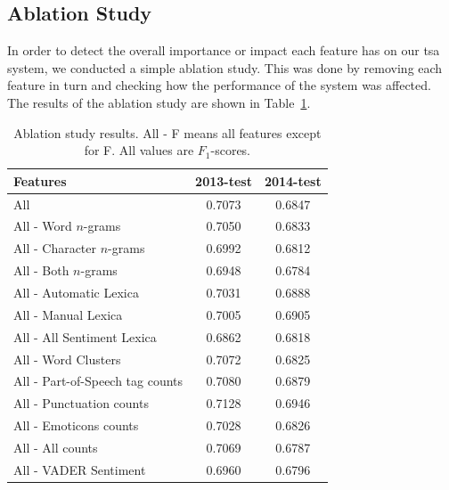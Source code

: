 \subsection*{Ablation Study}
\label{sec:ablation_study}
In order to detect the overall importance or impact each feature has on our \ac{tsa} system, we conducted a simple ablation study. This was done by removing each feature in turn and checking how the performance of the system was affected. The results of the ablation study are shown in Table~\ref{tab:ablation_study}. \\

\begin{table}[t]
    \centering
    \begin{tabular}{|l|c|c|}
        \hline
        \textbf{Features} & \textbf{2013-test} & \textbf{2014-test} \\ \hline
        All                             & 0.7073 & 0.6847 \\ \hline
        All - Word $n$-grams            & 0.7050 & 0.6833 \\
        All - Character $n$-grams       & 0.6992 & 0.6812 \\
        All - Both $n$-grams            & 0.6948 & 0.6784 \\ \hline
        All - Automatic Lexica          & 0.7031 & 0.6888 \\
        All - Manual Lexica             & 0.7005 & 0.6905 \\
        All - All Sentiment Lexica      & 0.6862 & 0.6818 \\ \hline
        All - Word Clusters             & 0.7072 & 0.6825 \\ \hline
        All - Part-of-Speech tag counts & 0.7080 & 0.6879 \\
        All - Punctuation counts        & 0.7128 & 0.6946 \\
        All - Emoticons counts          & 0.7028 & 0.6826 \\ 
        All - All counts                & 0.7069 & 0.6787 \\ \hline
        All - VADER Sentiment           & 0.6960 & 0.6796 \\ \hline
    \end{tabular}
\caption[Ablation study results for the Initial Experiment]{Ablation study results. All - F means all features except for F. All values are $F_1$-scores.}
    \label{tab:ablation_study}   
\end{table}

